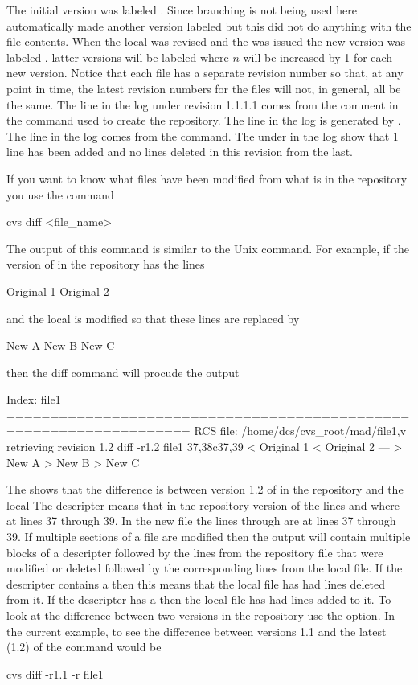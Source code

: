 The initial version was labeled . Since branching is not
being used here \cvs automatically made another version labeled
 but this did not do anything with the file contents. When the
local  was revised and the  was issued the
new version was labeled . latter versions will be labeled
 where $n$ will be increased by 1 for each new
version. Notice that each file has a separate revision number so that,
at any point in time, the latest revision numbers for the files will
not, in general, all be the same. The  line in the log
under revision 1.1.1.1 comes from the  comment in the  command used to create the  repository. The
 line in the log is generated by \cvs. The  line in the log comes from the  command.
The  under  in the log show that 1
line has been added and no lines deleted in this revision from the
last.

If you want to know what files have been modified from what is in the
repository you use the command
\begin{example}
  cvs diff <file_name>
\end{example}
The output of this command is similar to the Unix  command.
For example, if the version of  in the repository has the lines
\begin{example}
  Original 1
  Original 2
\end{example}
and the local  is modified so that these lines are replaced by
\begin{example}
  New A
  New B
  New C
\end{example}
then the diff command will procude the output
\begin{example}
  Index: file1
  ===================================================================
  RCS file: /home/dcs/cvs_root/mad/file1,v
  retrieving revision 1.2
  diff -r1.2 file1
  37,38c37,39
  < Original 1
  < Original 2
  ---
  > New A
  > New B
  > New C
\end{example}
The  shows that the difference is between version
1.2 of  in the repository and the local  The
 descripter means that in the repository version of
 the lines  and  where at
lines 37 through 39. In the new file the lines  through
 are at lines 37 through 39. If multiple sections of a file
are modified then the  output will contain multiple blocks of
a descripter followed by the lines from the repository file that were
modified or deleted followed by the corresponding lines from the local
file.  If the descripter contains a  then this means that the
local file has had lines deleted from it. If the descripter has a
 then the local file has had lines added to it. To look at the
difference between two versions in the repository use the  option. In the current example, to see the difference
between versions 1.1 and the latest (1.2) of  the command
would be
\begin{example}
  cvs diff -r1.1 -r file1
\end{example}

